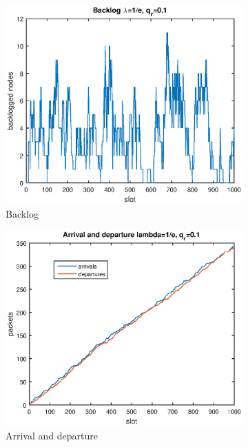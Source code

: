 \documentclass{article}
\begin{document}
\begin{figure}[h]
  \begin{subfigure}{.5\textwidth}
    \includegraphics[width=\textwidth]{figures/backlog3-2.eps}
    \caption{Backlog}
    \label{fig:backlog3-2}
  \end{subfigure}%
  \begin{subfigure}{.5\textwidth}
    \includegraphics[width=\textwidth]{figures/arrival-departure-3-2.eps}
    \caption{Arrival and departure}
    \label{fig:arrival-departure-3-2}
  \end{subfigure}
  \caption{}
\end{figure}
\end{document}

